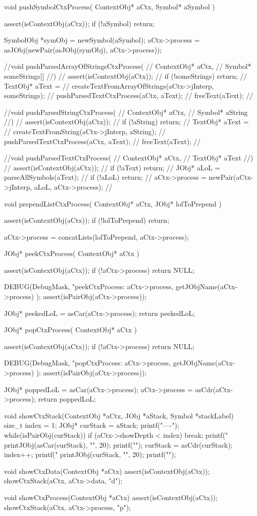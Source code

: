 void pushSymbolCtxProcess(
  ContextObj* aCtx,
  Symbol* aSymbol
) {
  assert(isContextObj(aCtx));
  if (!aSymbol) return;

  SymbolObj *symObj = newSymbol(aSymbol);
  aCtx->process =
    asJObj(newPair(asJObj(symObj), aCtx->process));
}

//void pushParsedArrayOfStringsCtxProcess(
//  ContextObj* aCtx,
//  Symbol* someStrings[]
//) {
//  assert(isContextObj(aCtx));
//  if (!someStrings) return;
//  TextObj* aText =
//    createTextFromArrayOfStrings(aCtx->jInterp, someStrings);
//  pushParsedTextCtxProcess(aCtx, aText);
//  freeText(aText);
//}

//void pushParsedStringCtxProcess(
//  ContextObj* aCtx,
//  Symbol* aString
//) {
//  assert(isContextObj(aCtx));
//  if (!aString) return;
//  TextObj* aText =
//    createTextFromString(aCtx->jInterp, aString);
//  pushParsedTextCtxProcess(aCtx, aText);
//  freeText(aText);
//}

//void pushParsedTextCtxProcess(
//  ContextObj* aCtx,
//  TextObj* aText
//) {
//  assert(isContextObj(aCtx));
//  if (!aText) return;
//  JObj* aLoL = parseAllSymbols(aText);
//  if (!aLoL) return;
//  aCtx->process = newPair(aCtx->jInterp, aLoL, aCtx->process);
//}

void prependListCtxProcess(
  ContextObj* aCtx,
  JObj* lolToPrepend
) {
  assert(isContextObj(aCtx));
  if (!lolToPrepend) return;

  aCtx->process =
    concatLists(lolToPrepend, aCtx->process);
}

JObj* peekCtxProcess(
  ContextObj* aCtx
) {
  assert(isContextObj(aCtx));
  if (!aCtx->process) return NULL;

  DEBUG(DebugMask, "peekCtxProcess: %
    aCtx->process, getJObjName(aCtx->process)
  );
  assert(isPairObj(aCtx->process));
 
  JObj* peekedLoL = asCar(aCtx->process);
  return peekedLoL;
}

JObj* popCtxProcess(
  ContextObj* aCtx
) {
  assert(isContextObj(aCtx));
  if (!aCtx->process) return NULL;

  DEBUG(DebugMask, "popCtxProcess: %
    aCtx->process, getJObjName(aCtx->process)
  );
  assert(isPairObj(aCtx->process));
 
  JObj* poppedLoL = asCar(aCtx->process);
  aCtx->process   = asCdr(aCtx->process);
  return poppedLoL;
}

void showCtxStack(ContextObj *aCtx, JObj *aStack, Symbol *stackLabel) {
  size_t index = 1;
  JObj* curStack = aStack;
  printf("----\n");
  while(isPairObj(curStack)) {
    if (aCtx->showDepth < index) break;
    printf("%
    printJObj(asCar(curStack), "", 20);
    printf("\n");
    curStack = asCdr(curStack);
    index++;
  }
  printf("%
  printJObj(curStack, "", 20);
  printf("\n");
}

void showCtxData(ContextObj *aCtx) {
  assert(isContextObj(aCtx));
  showCtxStack(aCtx, aCtx->data, "d");
}

void showCtxProcess(ContextObj *aCtx) {
  assert(isContextObj(aCtx));
  showCtxStack(aCtx, aCtx->process, "p");
}

\stopCCode